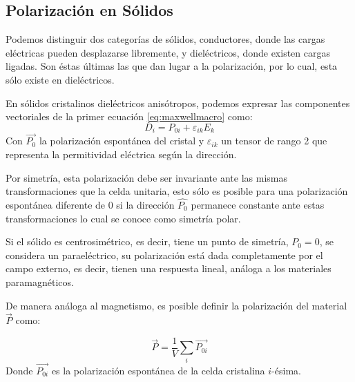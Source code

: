 \documentclass[../main.tex]{subfiles}
\begin{document}
\subsection{Polarización en Sólidos}
Podemos distinguir dos categorías de sólidos, conductores, donde las cargas eléctricas pueden desplazarse libremente, y dieléctricos, donde existen cargas ligadas. Son éstas últimas las que dan lugar a la polarización, por lo cual, esta sólo existe en dieléctricos.

En sólidos cristalinos dieléctricos anisótropos, podemos expresar las componentes vectoriales de la primer ecuación \ref{eq:maxwellmacro} como:
\begin{equation}
    D_i=P_{0i}+\varepsilon_{ik}E_k
    \label{eq:macroelec}
\end{equation}
Con $\vec{P_{0}}$ la polarización espontánea del cristal y $\varepsilon_{ik}$ un tensor de rango 2 que representa la permitividad eléctrica según la dirección.

Por simetría, esta polarización debe ser invariante ante las mismas transformaciones que la celda unitaria, esto sólo es posible para una polarización espontánea diferente de 0 si la dirección $\hat{P_{0}}$ permanece constante ante estas transformaciones lo cual se conoce como simetría polar.

Si el sólido es centrosimétrico, es decir, tiene un punto de simetría, $P_0=0$, se considera un paraeléctrico, su polarización está dada completamente por el campo externo, es decir, tienen una respuesta lineal, análoga a los materiales paramagnéticos.


De manera análoga al magnetismo, es posible definir la polarización del material $\vec{P}$ como:

\begin{equation}
    \vec{P}=\dfrac{1}{V}\sum_{i}\vec{P_{0i}}
    \label{eq:polarizacionmicromacro}
\end{equation}
Donde $\vec{P_{0i}}$ es la polarización espontánea de la celda cristalina $i$-ésima.
\end{document}
